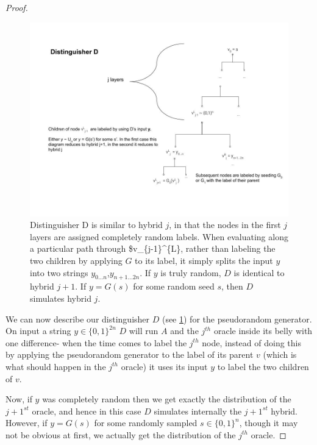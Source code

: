 \begin{proof}
\begin{figure}
\centering
\includegraphics[width=\textwidth, height=0.25\paperheight, keepaspectratio]{../figure/distinguisher_D_thm_5-1.jpg}
\caption{Distinguisher D is similar to hybrid \(j\), in that the nodes
in the first \(j\) layers are assigned completely random labels. When
evaluating along a particular path through \$v\_\{j-1\}\^{}\{L\}, rather
than labeling the two children by applying \(G\) to its label, it simply
splits the input \(y\) into two strings \(y_{0...n}\),\(y_{n+1...2n}\).
If \(y\) is truly random, \(D\) is identical to hybrid \(j+1\). If
\(y=G(s)\) for some random seed \(s\), then \(D\) simulates hybrid
\(j\).}
\label{distinguisherd}
\end{figure}

We can now describe our distinguisher \(D\) (see \cref{distinguisherd})
for the pseudorandom generator. On input a string \(y\in\{0,1\}^{2n}\)
\(D\) will run \(A\) and the \(j^{th}\) oracle inside its belly with one
difference- when the time comes to label the \(j^{th}\) node, instead of
doing this by applying the pseudorandom generator to the label of its
parent \(v\) (which is what should happen in the \(j^{th}\) oracle) it
uses its input \(y\) to label the two children of \(v\).

Now, if \(y\) was completely random then we get exactly the distribution
of the \(j+1^{st}\) oracle, and hence in this case \(D\) simulates
internally the \(j+1^{st}\) hybrid. However, if \(y=G(s)\) for some
randomly sampled \(s\in\{0,1\}^n\), though it may not be obvious at
first, we actually get the distribution of the \(j^{th}\) oracle.


\end{proof}
